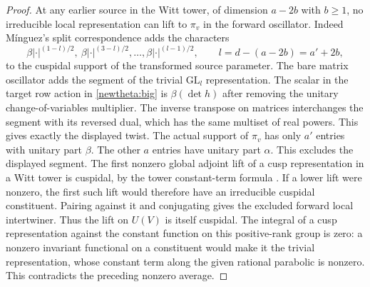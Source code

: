 \begin{proof}
At any earlier source in the Witt tower, of dimension \(a-2b\)
with \(b\ge1\), no irreducible local representation can lift to
\(\pi_v\) in the forward oscillator. Indeed M\'inguez's split
correspondence adds the characters
\[
   \beta|\cdot|^{(1-l)/2},\
   \beta|\cdot|^{(3-l)/2},\ldots,\beta|\cdot|^{(l-1)/2},
               \qquad l=d-(a-2b)=a'+2b ,
\]
to the cuspidal support of the transformed source parameter.
The bare matrix oscillator adds the segment of the trivial
\(\mathrm{GL}_l\) representation. The scalar in the target row
action in \eqref{newtheta:big} is \(\beta(\det h)\) after removing
the unitary change-of-variables multiplier. The inverse transpose
on matrices interchanges the segment with its reversed dual, which
has the same multiset of real powers. This gives exactly the
displayed twist. The actual support of \(\pi_v\) has only \(a'\)
entries with unitary part \(\beta\). The other \(a\) entries have
unitary part \(\alpha\). This excludes the displayed segment.
\cite[Corollary~6.3(2)]{minguezHowe}
The first nonzero global adjoint lift of a cusp representation in a
Witt tower is cuspidal, by the tower constant-term formula
\cite[Proposition~3.1]{wuThetaTower}. If a lower lift were nonzero,
the first such lift would therefore have an irreducible cuspidal
constituent. Pairing against it and conjugating gives the excluded
forward local intertwiner. Thus the lift on \(U(V)\) is itself
cuspidal. The integral of a cusp representation against the constant
function on this positive-rank group is zero: a nonzero invariant
functional on a constituent would make it the trivial representation,
whose constant term along the given rational parabolic is nonzero.
This contradicts the preceding nonzero average.


\end{proof}
